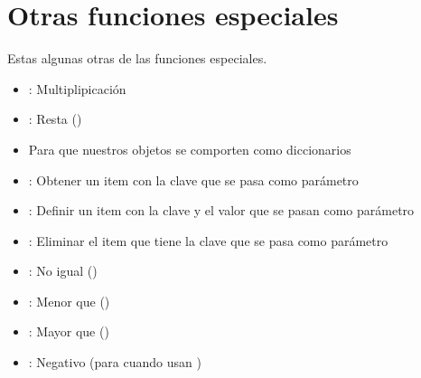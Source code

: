 \documentclass[a4paper,12pt,spanish]{sphinxmanual}
\begin{document}
\chapter{Otras funciones especiales}
\label{\detokenize{class-extras:otras-funciones-especiales}}
\sphinxAtStartPar
Estas algunas otras de las funciones especiales.
\begin{itemize}
\item {} 
\sphinxAtStartPar
{}: Multiplipicación

\item {} 
\sphinxAtStartPar
{}: Resta ()

\item {} 
\sphinxAtStartPar
Para que nuestros objetos se comporten como diccionarios

\end{itemize}
\begin{itemize}
\item {} 
\sphinxAtStartPar
{}: Obtener un item con la clave que se pasa como parámetro

\item {} 
\sphinxAtStartPar
{}: Definir un item con la clave y el valor que se pasan como parámetro

\item {} 
\sphinxAtStartPar
{}: Eliminar el item que tiene la clave que se pasa como parámetro

\end{itemize}
\begin{itemize}
\item {} 
\sphinxAtStartPar
{}: No igual () \sphinxcode{\sphinxupquote{!=}}

\item {} 
\sphinxAtStartPar
{}: Menor que () \sphinxcode{\sphinxupquote{\textless{}}}

\item {} 
\sphinxAtStartPar
{}: Mayor que () \sphinxcode{\sphinxupquote{\textgreater{}}}

\item {} 
\sphinxAtStartPar
{}: Negativo (para cuando usan )

\end{itemize}
\end{document}
